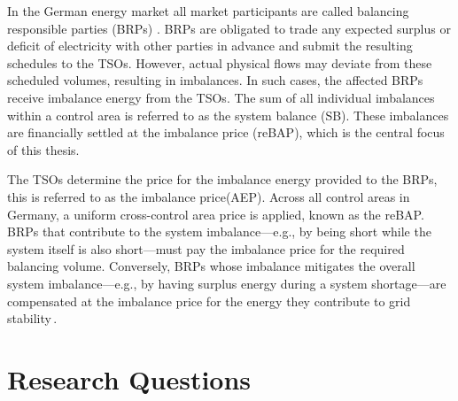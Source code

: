 \documentclass[class=scrbook, crop=false]{standalone}
\begin{document}
In the German energy market all market participants are called balancing responsible parties (BRPs) \cite{narajewskiProbabilisticForecastingGerman2022}. 
BRPs are obligated to trade any expected surplus or deficit of electricity with other parties in advance and submit the resulting schedules to the TSOs. 
However, actual physical flows may deviate from these scheduled volumes, resulting in imbalances. 
In such cases, the affected BRPs receive imbalance energy from the TSOs.
The sum of all individual imbalances within a control area is referred to as the system balance (SB)\cite{eickeElectricityBalancingMarket2021}.
These imbalances are financially settled at the imbalance price (reBAP), which is the central focus of this thesis.

The TSOs determine the price for the imbalance energy provided to the BRPs, this is referred to as the imbalance price(AEP). Across all control areas in Germany, a uniform cross-control area price is applied, known as the reBAP.
BRPs that contribute to the system imbalance—e.g., by being short while the system itself is also short—must pay the imbalance price for the required balancing volume. Conversely, BRPs whose imbalance mitigates the overall system imbalance—e.g., by having surplus energy during a system shortage—are compensated at the imbalance price for the energy they contribute to grid stability \cite{eickeElectricityBalancingMarket2021}.


\section{Research Questions}
\label{Section::Research_Questions}
\end{document}
